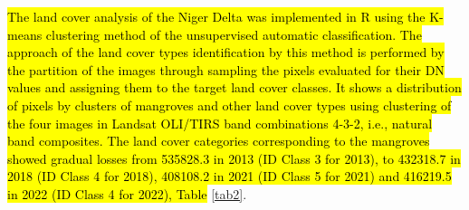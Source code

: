 \documentclass[jmse,article,submit,pdftex,moreauthors]{Definitions/mdpi}
\begin{document}
\hl{The land cover analysis of the Niger Delta was implemented in R using the K-means clustering method of the unsupervised automatic classification. The approach of the land cover types identification by this method is performed by the partition of the images through sampling the pixels evaluated for their DN values and assigning them to the target land  cover classes. It shows a distribution of pixels by clusters of mangroves and other land cover types using clustering of the four images in Landsat OLI/TIRS band combinations 4-3-2, i.e., natural band composites. The land cover categories corresponding to the mangroves showed gradual losses from 535828.3 in 2013 (ID Class 3 for 2013), to 432318.7 in 2018 (ID Class 4 for 2018), 408108.2 in 2021 (ID Class 5 for 2021) and 416219.5 in 2022 (ID Class 4 for 2022), Table} \ref{tab2}.
\end{document}
